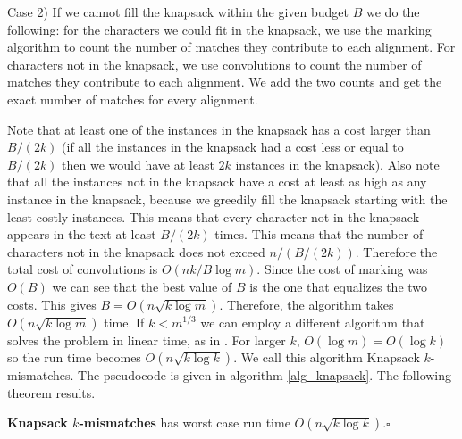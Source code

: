 Case 2) If we cannot fill the knapsack within the given budget $B$ we do the
following: for the characters we could fit in the knapsack, we use the marking
algorithm to count the number of matches they contribute to each alignment. For
characters not in the knapsack, we use convolutions to count the number of
matches they contribute to each alignment. We add the two counts and get the
exact number of matches for every alignment. 

Note that at
least one of the instances in the knapsack has a cost larger than $B/(2k)$ (if
all the instances in the knapsack had a cost less or equal to $B/(2k)$ then we would
have at least $2k$ instances in the knapsack). Also note that all the
instances not in the knapsack have a cost at least as high as any instance in
the knapsack, because we greedily fill the knapsack starting with the least
costly instances. This means that every character not in the knapsack appears
in the text at least $B/(2k)$ times. This means that the number of characters
not in the knapsack does not exceed $n/(B/(2k))$. Therefore the total cost of
convolutions is $O(nk/B\log m)$. Since the cost of marking was $O(B)$ we can see
that the best value of $B$ is the one that equalizes the two costs. This gives
$B=O(n\sqrt{k\log m})$. Therefore, the algorithm takes $O(n\sqrt{k\log m})$
time. If $k < m^{1/3}$  we can employ a different algorithm
that solves the problem in linear time, as in \cite{ALP04}. For larger $k$,
$O(\log m) = O(\log k)$ so the run time becomes $O(n \sqrt{k \log k})$. We call this algorithm
{Knapsack $k$-mismatches}. The pseudocode is given in algorithm
\ref{alg_knapsack}. The following theorem results.


\begin{theorem}
{\bf Knapsack $k$-mismatches} has worst case run time $O(n \sqrt{k \log
k})$.$\square$
\end{theorem}

{\LinesNumberedHidden
\begin{algorithm}
\caption{Knapsack $k$-mismatches($T, P, k$)}\label{alg_knapsack}
\end{algorithm}
}

